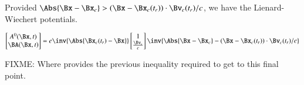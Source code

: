 Provided $\Abs{\Bx - \Bx_c} > (\Bx - \Bx_c(t_r)) \cdot \Bv_c(t_r)/c$, we have the Lienard-Wiechert potentials.

\begin{equation}\label{eqn:relativisticElectrodynamicsL18:720}
\begin{bmatrix}
A^0(\Bx, t) \\
\BA(\Bx, t)
\end{bmatrix}
=
e \inv{\Abs{\Bx_c(t_r) - \Bx}}
\begin{bmatrix}
1 \\
\frac{\Bv_c}{c}
\end{bmatrix}
\inv{
\Abs{\Bx - \Bx_c} - (\Bx - \Bx_c(t_r)) \cdot \Bv_c(t_r)/c }
\end{equation}

FIXME: Where provides the previous inequality required to get to this final point.

\EndArticle
